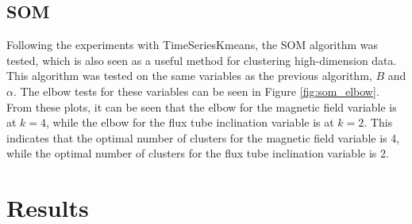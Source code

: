 \subsection{SOM}\label{sec:som_experiments}
Following the experiments with TimeSeriesKmeans, the SOM algorithm was tested, which is also seen as a useful method for clustering high-dimension data. This algorithm was tested on the same variables as the previous algorithm, $B$ and $\alpha$. The elbow tests for these variables can be seen in Figure \ref{fig:som_elbow}. From these plots, it can be seen that the elbow for the magnetic field variable is at $k=4$, while the elbow for the flux tube inclination variable is at $k=2$. This indicates that the optimal number of clusters for the magnetic field variable is 4, while the optimal number of clusters for the flux tube inclination variable is 2.

\section{Results}\label{sec:clustering_results}
